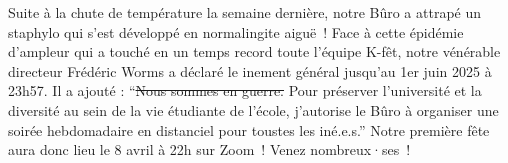 Suite à la chute de température la semaine dernière, notre Bûro a attrapé un staphylo\cof{} qui s’est développé en
normalingite aiguë~! 
Face à cette épidémie d’ampleur qui a touché en un temps record toute l’équipe K-fêt, notre vénérable directeur Frédéric
Worms a déclaré le \cof{}inement général jusqu’au 1er juin 2025 à 23h57. 
Il a ajouté : “\sout{Nous sommes en guerre.} Pour préserver l’université et la diversité au sein de la vie étudiante de
l’école, j’autorise le Bûro à organiser une soirée hebdomadaire en distanciel pour toustes les \cof{}iné.e.s.” 
Notre première fête aura donc lieu le 8 avril à 22h sur Zoom~! Venez nombreux·ses~!

\Pandada
